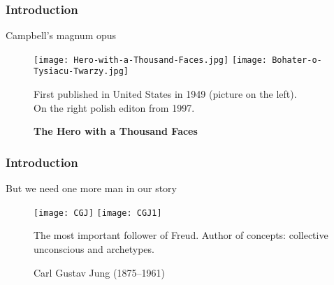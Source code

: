 \documentclass[10pt,t]{beamer}
\begin{document}
\begin{frame}
  \frametitle{Introduction}

  \begin{block}{Campbell's magnum opus}
    \begin{figure}
      \centering

      \texttt{[image: Hero-with-a-Thousand-Faces.jpg]}
      \texttt{[image: Bohater-o-Tysiacu-Twarzy.jpg]}

      \caption{\textbf{The Hero with a Thousand Faces}}
      First published in United States in 1949 (picture on the
      left). \\
      On the right polish editon from 1997.
    \end{figure}
  \end{block}

\end{frame}



\begin{frame}
  \frametitle{Introduction}

  \begin{block}{But we need one more man in our story}
    \begin{figure}
      \centering

      \texttt{[image: CGJ]}
      \texttt{[image: CGJ1]}
      \caption{Carl Gustav Jung (1875--1961)}
      The most important follower of Freud. Author of concepts:
      collective unconscious and archetypes.
    \end{figure}
  \end{block}

\end{frame}
\end{document}

